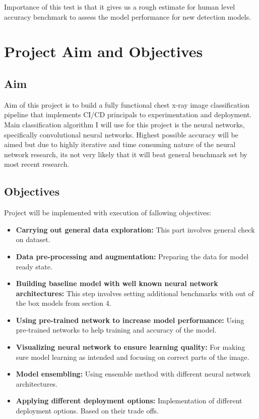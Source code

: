 \documentclass[12pt, twoside, a4paper]{article}
\begin{document}
Importance of this test is that it gives us a rough estimate for human level accuracy benchmark to assess the model performance for new detection models.
\clearpage

\section{Project Aim and Objectives}
\subsection{Aim}
Aim of this project is to build a fully functional chest x-ray image classification pipeline that implements CI/CD principals to experimentation and deployment. Main classification algorithm I will use for this project is the neural networks, specifically convolutional neural networks. Highest possible accuracy will be aimed but due to highly iterative and time consuming nature of the neural network research, its not very likely that it will beat general benchmark set by most recent research.

\subsection{Objectives}
Project will be implemented with execution of fallowing objectives:
\begin{itemize}
    \item \textbf{Carrying out general data exploration: }This part involves general check on dataset.
    \item \textbf{Data pre-processing and augmentation: }Preparing the data for model ready state.
    \item \textbf{Building baseline model with well known neural network architectures: }This step involves setting additional benchmarks with out of the box models from section 4.
    \item \textbf{Using pre-trained network to increase model performance: }Using pre-trained networks to help training and accuracy of the model.
    \item \textbf{Visualizing neural network to ensure learning quality: } For making sure model learning as intended and focusing on correct parts of the image.
    \item \textbf{Model ensembling: }Using ensemble method with different neural network architectures.
    \item \textbf{Applying different deployment options: } Implementation of different deployment options. Based on their trade offs. 
\end{itemize}
\clearpage
\end{document}
